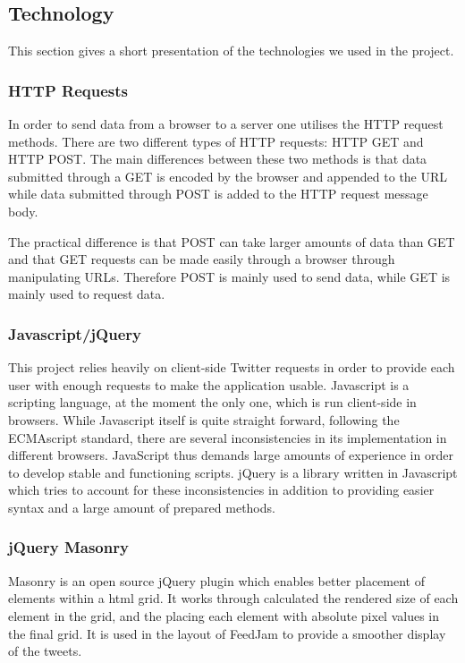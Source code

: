\subsection{Technology}
This section gives a short presentation of the technologies we used in the project. 

\subsubsection{HTTP Requests}
In order to send data from a browser to a server one utilises the HTTP request methods. There are two different types of HTTP requests: HTTP GET and HTTP POST. The main differences between these two methods is that data submitted through a GET is encoded by the browser and appended to the URL while data submitted through POST is added to the HTTP request message body.

The practical difference is that POST can take larger amounts of data than GET and that GET requests can be made easily through a browser through manipulating URLs. Therefore POST is mainly used to send data, while GET is mainly used to request data.

\subsubsection{Javascript/jQuery} %
This project relies heavily on client-side Twitter requests in order to provide each user with enough requests to make the application usable. Javascript is a scripting language, at the moment the only one, which is run client-side in browsers. While Javascript itself is quite straight forward, following the ECMAscript standard, there are several inconsistencies in its implementation in different browsers. JavaScript thus demands large amounts of experience in order to develop stable and functioning scripts. jQuery is a library written in Javascript which tries to account for these inconsistencies in addition to providing easier syntax and a large amount of prepared methods.

\subsubsection{jQuery Masonry}
Masonry is an open source jQuery plugin which enables better placement of elements within a html grid. It works through calculated the rendered size of each element in the grid, and the placing each element with absolute pixel values in the final grid. It is used in the layout of FeedJam to provide a smoother display of the tweets.

